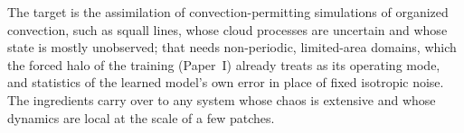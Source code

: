  The target is the assimilation of convection-permitting
simulations of organized convection, such as squall lines, whose cloud
processes are uncertain and whose state is mostly unobserved; that needs
non-periodic, limited-area domains, which the forced halo of the training
(Paper~I) already treats as its operating mode, and statistics of the
learned model's own error in place of fixed isotropic noise. The
ingredients carry over to any system whose chaos is extensive and whose
dynamics are local at the scale of a few patches.
